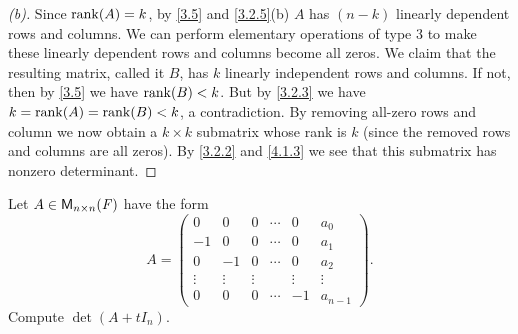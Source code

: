 \begin{proof}[(b)]
	Since \(\rk{A} = k\), by \cref{3.5} and \cref{3.2.5}(b) \(A\) has \((n - k)\) linearly dependent rows and columns.
	We can perform elementary operations of type 3 to make these linearly dependent rows and columns become all zeros.
	We claim that the resulting matrix, called it \(B\), has \(k\) linearly independent rows and columns.
	If not, then by \cref{3.5} we have \(\rk{B} < k\).
	But by \cref{3.2.3} we have \(k = \rk{A} = \rk{B} < k\), a contradiction.
	By removing all-zero rows and column we now obtain a \(k \times k\) submatrix whose rank is \(k\) (since the removed rows and columns are all zeros).
	By \cref{3.2.2} and \cref{4.1.3} we see that this submatrix has nonzero determinant.
\end{proof}

\begin{ex}\label{ex:4.2.24}
	Let \(A \in \mathsf{M}_{{n} \times n}({\mathit{F}})\) have the form
	\[
		A = \begin{pmatrix}
			0      & 0      & 0      & \cdots & 0      & a_0       \\
			-1     & 0      & 0      & \cdots & 0      & a_1       \\
			0      & -1     & 0      & \cdots & 0      & a_2       \\
			\vdots & \vdots & \vdots &        & \vdots & \vdots    \\
			0      & 0      & 0      & \cdots & -1     & a_{n - 1}
		\end{pmatrix}.
	\]
	Compute \(\det(A + t I_n)\).
\end{ex}

